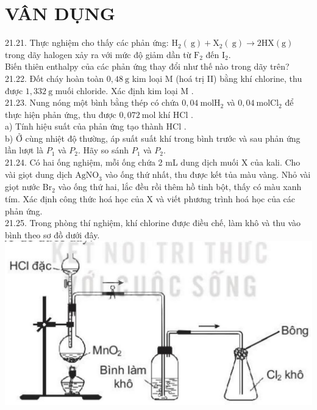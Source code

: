 \documentclass[10pt]{article}
\begin{document}
\section*{VÂN DỤNG}
21.21. Thực nghiệm cho thấy các phản ứng: $\mathrm{H}_{2}(\mathrm{~g})+\mathrm{X}_{2}(\mathrm{~g}) \longrightarrow 2 \mathrm{HX}(\mathrm{g})$ trong dãy halogen xảy ra với mức độ giảm dần từ $\mathrm{F}_{2}$ đến $\mathrm{I}_{2}$.\\
Biến thiên enthalpy của các phản ứng thay đổi như thế nào trong dãy trên?\\
21.22. Đốt cháy hoàn toàn $0,48 \mathrm{~g}$ kim loại M (hoá trị II) bằng khí chlorine, thu được $1,332 \mathrm{~g}$ muối chloride. Xác định kim loại M .\\
21.23. Nung nóng một bình bằng thép có chứa $0,04 \mathrm{~mol} \mathrm{H}_{2}$ và $0,04 \mathrm{~mol} \mathrm{Cl}_{2}$ để thực hiện phản ứng, thu được $0,072 \mathrm{~mol}$ khí HCl .\\
a) Tính hiệu suất của phản ứng tạo thành HCl .\\
b) Ở cùng nhiệt độ thường, áp suất suất khí trong bình trước và sau phản ứng lần lượt là $P_{1}$ và $P_{2}$. Hãy so sánh $P_{1}$ và $P_{2}$.\\
21.24. Có hai ống nghiệm, mỗi ống chứa 2 mL dung dịch muối X của kali. Cho vài giọt dung dịch $\mathrm{AgNO}_{3}$ vào ống thứ nhất, thu được kết tủa màu vàng. Nhỏ vài giọt nước $\mathrm{Br}_{2}$ vào ống thứ hai, lắc đều rồi thêm hồ tinh bột, thấy có màu xanh tím. Xác định công thức hoá học của X và viết phương trình hoá học của các phản ứng.\\
21.25. Trong phòng thí nghiệm, khí chlorine được điều chế, làm khô và thu vào bình theo sơ đồ dưới đây.\\
\includegraphics[max width=\textwidth, center]{2025_10_23_daab5c8457c85b365b9eg-64}
\end{document}

